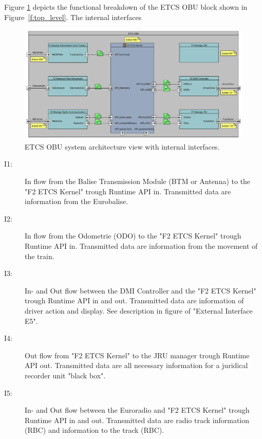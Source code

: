 Figure \ref{f:ETCS_OBU_decomposition} depicts the functional breakdown of the ETCS OBU block shown in Figure~\ref{f:top_level}. The internal interfaces
\begin{figure}
\centering
\includegraphics[width=\textwidth]{images/F2_ETCS_Kernel.pdf}
\caption{ETCS OBU system architecture view with internal interfaces.}
\label{f:ETCS_OBU_decomposition}
\end{figure}
\begin{description}
\item[I1:] In flow from the Balise Transmission Module (BTM or Antenna) to the "F2 ETCS Kernel" trough Runtime API in. Transmitted data are information from the Eurobalise.

\item[I2:] In flow from the Odometrie (ODO) to the "F2 ETCS Kernel" trough Runtime API in. Transmitted data are information from the movement of the train.

\item[I3:] In- and Out flow between the DMI Controller and the "F2 ETCS Kernel" trough Runtime API in and out. Transmitted data are information of driver action and display. See description in figure of "External Interface E5".

\item[I4:] Out flow from "F2 ETCS Kernel" to the JRU manager trough Runtime API out. Transmitted data are all necessary information for a juridical recorder unit "black box".

\item[I5:] In- and Out flow between the Euroradio and "F2 ETCS Kernel" trough Runtime API in and out. Transmitted data are radio track information (RBC) and information to the track (RBC). 
\end{description}






